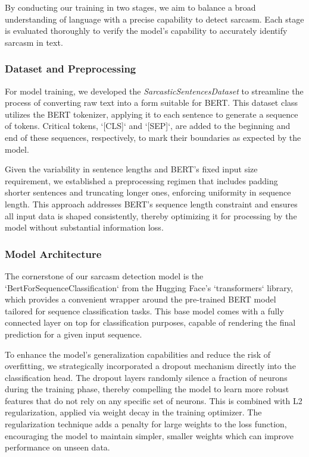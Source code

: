 \documentclass[10pt,twocolumn,letterpaper]{article}
\begin{document}
By conducting our training in two stages, we aim to balance a broad understanding of language with a precise capability to detect sarcasm. Each stage is evaluated thoroughly to verify the model’s capability to accurately identify sarcasm in text.  
\subsubsection{Dataset and Preprocessing}
For model training, we developed the \textit{SarcasticSentencesDataset} to streamline the process of converting raw text into a form suitable for BERT. This dataset class utilizes the BERT tokenizer, applying it to each sentence to generate a sequence of tokens. Critical tokens, `[CLS]` and `[SEP]`, are added to the beginning and end of these sequences, respectively, to mark their boundaries as expected by the model.

Given the variability in sentence lengths and BERT's fixed input size requirement, we established a preprocessing regimen that includes padding shorter sentences and truncating longer ones, enforcing uniformity in sequence length. This approach addresses BERT's sequence length constraint and ensures all input data is shaped consistently, thereby optimizing it for processing by the model without substantial information loss.

\subsubsection{Model Architecture}
The cornerstone of our sarcasm detection model is the `BertForSequenceClassification` from the Hugging Face's `transformers` library, which provides a convenient wrapper around the pre-trained BERT model tailored for sequence classification tasks. This base model comes with a fully connected layer on top for classification purposes, capable of rendering the final prediction for a given input sequence.

To enhance the model's generalization capabilities and reduce the risk of overfitting, we strategically incorporated a dropout mechanism directly into the classification head. The dropout layers randomly silence a fraction of neurons during the training phase, thereby compelling the model to learn more robust features that do not rely on any specific set of neurons. This is combined with L2 regularization, applied via weight decay in the training optimizer. The regularization technique adds a penalty for large weights to the loss function, encouraging the model to maintain simpler, smaller weights which can improve performance on unseen data.
\end{document}
